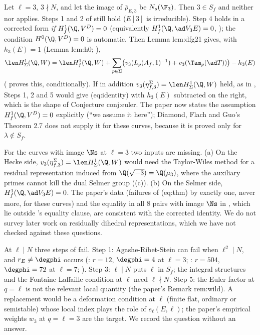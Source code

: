 \begin{remark}\label{rem:congruence:rem-ns}
Let $\ell=3$, $3\nmid N$, and let the image of $\bar\rho_{E,3}$ be $N_s(\F_3)$. Then $3\in S_f$ and neither  nor  applies. Steps 1 and 2 of
 still hold ($E[3]$ is irreducible). Step 4 holds in a corrected form \emph{if} $H^1_f(\Q,V^D)=0$ (equivalently $H^1_f(\Q,\ad V_3E)=0$, ); the condition
$H^0(\Q,V^D)=0$ is automatic. Then Lemma lem:dfg21 gives, with $h_3(E)=1$ (Lemma lem:h0; ),
\[
\len H^1_\Sigma(\Q,W)=\len H^1_f(\Q,W)+\sum_{p\in\Sigma}\bigl(v_3(L_p(A_f,1)^{-1})+v_3(\Tam_p(\ad T))\bigr)-h_3(E)
\]
( proves this, conditionally). If in addition $v_3(\eta^\Sigma_{f,3})=\len H^1_\Sigma(\Q,W)$ held, as in , Steps 1, 2 and 5 would give (eq:identity) with $h_3(E)$
subtracted on the right, which is the shape of Conjecture conj:euler. The paper now states the assumption $H^1_f(\Q,V^D)=0$ explicitly (``we assume it here''); Diamond, Flach and Guo's Theorem 2.7 does
not supply it for these curves, because it is proved only for $\lambda\notin S_f$.
\end{remark}

\begin{remark}\label{rem:congruence:open-question-2}
For the curves with image $\Ns$ at $\ell=3$ two inputs are missing. (a) On the Hecke side, $v_3(\eta^\Sigma_{f,3})=\len H^1_\Sigma(\Q,W)$ would need the Taylor-Wiles method for a residual representation induced
from $\Q(\sqrt{-3})=\Q(\mu_3)$, where the auxiliary primes cannot kill the dual Selmer group ((c)). (b) On the Selmer side, $H^1_f(\Q,\ad V_3E)=0$. The paper's data
(failures of (eq:thm) by exactly one, never more, for these curves) and the equality in all $8$ pairs with image $\Ns$ in , which lie outside
's equality clause, are consistent with the corrected identity. We do not survey later work on residually dihedral representations, which we have not checked
against these questions.
\end{remark}

\begin{remark}\label{rem:congruence:open-question-1}
At $\ell\mid N$ three steps of  fail. Step 1: Agashe-Ribet-Stein can fail when $\ell^2\mid N$, and $r_E\ne\degphi$ occurs (: $r=12$, $\degphi=4$ at $\ell=3$; : $r=504$,
$\degphi=72$ at $\ell=7$; ). Step 3: $\ell\mid N$ puts $\ell$ in $S_f$; the integral structures and the Fontaine-Laffaille condition at $\ell$ need $\ell\nmid N$. Step 5: the Euler factor at $q=\ell$ is not
the relevant local quantity (the paper's Remark rem:wild). A replacement would be a deformation condition at $\ell$ (finite flat, ordinary or semistable) whose local index plays the role of
$e_\ell(E,\ell)$; the paper's empirical weights $w_3$ at $q=\ell=3$ are the target. We record the question without an answer.
\end{remark}

